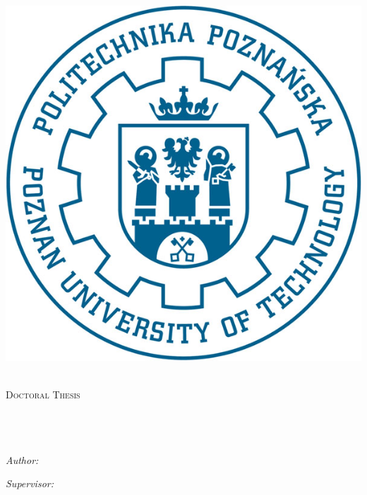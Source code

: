 \documentclass[11pt, a4paper, twoside]{Thesis} %
\begin{document}
\begin{titlepage}
\begin{center}

\includegraphics[scale=0.5]{pp_logo2} %

\textsc{\LARGE \univname}\\[1.5cm] %
\textsc{\Large Doctoral Thesis}\\[0.5cm] %

\HRule \\[0.4cm] %
{\huge \bfseries \ttitle}\\[0.4cm] %
\HRule \\[1.5cm] %
 
\begin{minipage}{\textwidth}
\begin{center} \large
\emph{Author:} \\
{\authornames} %
\end{center}

\begin{center} \large
\emph{Supervisor:} \\
{\supname} \\ %
\end{center}
\end{minipage}\\[3cm]


\end{center}
\end{titlepage}
\end{document}
